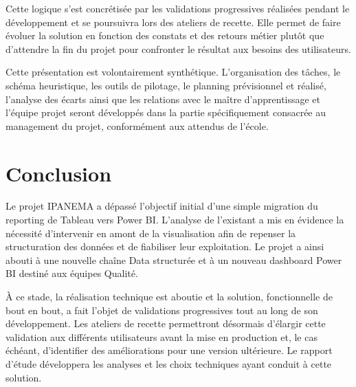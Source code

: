 Cette logique s'est concrétisée par les validations progressives réalisées pendant le 
développement et se poursuivra lors des ateliers de recette. Elle permet de faire évoluer la 
solution en fonction des constats et des retours métier plutôt que d'attendre la fin du projet 
pour confronter le résultat aux besoins des utilisateurs. 

Cette présentation est volontairement synthétique. L'organisation des tâches, le 
schéma heuristique, les outils de pilotage, le planning prévisionnel et réalisé, l'analyse des 
écarts ainsi que les relations avec le maître d'apprentissage et l'équipe projet seront 
développés dans la partie spécifiquement consacrée au management du projet, conformément 
aux attendus de l'école.


\section{ Conclusion}
\label{sec16}
Le projet IPANEMA a dépassé l'objectif initial d'une simple migration du reporting de 
Tableau vers Power BI. L'analyse de l'existant a mis en évidence la nécessité d'intervenir en 
amont de la visualisation afin de repenser la structuration des données et de fiabiliser leur 
exploitation. Le projet a ainsi abouti à une nouvelle chaîne Data structurée et à un nouveau 
dashboard Power BI destiné aux équipes Qualité. 

À ce stade, la réalisation technique est aboutie et la solution, fonctionnelle de bout en bout, a 
fait l'objet de validations progressives tout au long de son développement. Les ateliers de 
recette permettront désormais d'élargir cette validation aux différents utilisateurs avant la mise 
en production et, le cas échéant, d'identifier des améliorations pour une version ultérieure. Le 
rapport d'étude développera les analyses et les choix techniques ayant conduit à cette 
solution.
